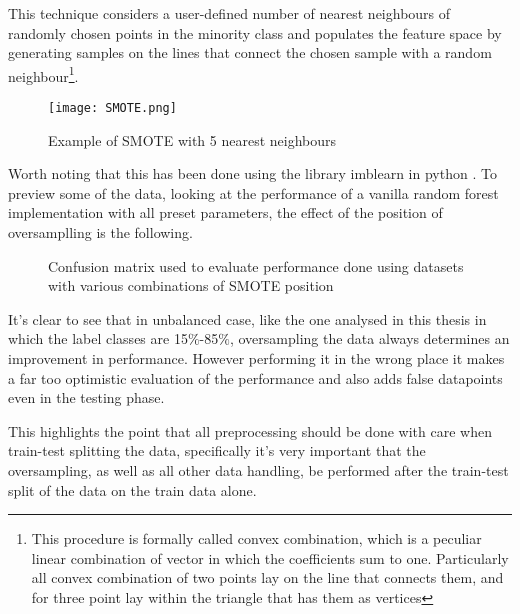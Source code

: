 This technique considers a user-defined number of nearest neighbours of randomly chosen points in the minority class and populates the feature space by generating samples on the lines that connect the chosen sample with a random neighbour\footnote{This procedure is formally called convex combination, which is a peculiar linear combination of vector in which the coefficients sum to one. Particularly all convex combination of two points lay on the line that connects them, and for three point lay within the triangle that has them as vertices}.


\begin{figure}[H]
		\centering
  		\texttt{[image: SMOTE.png]}
        \caption{Example of SMOTE with 5 nearest neighbours}
\end{figure}

Worth noting that this has been done using the library imblearn in python \cite{imblearn}. To preview some of the data, looking at the performance of a vanilla random forest implementation with all preset parameters, the effect of the position of oversamplling is the following.


\begin{figure}[H]
\centering
\centering \newline
    \caption{Confusion matrix used to evaluate performance done using datasets with various combinations of SMOTE position}\label{fig:smote_after}
\end{figure}

It's clear to see that in unbalanced case, like the one analysed in this thesis in which the label classes are 15$\%$-85$\%$, oversampling the data always determines an improvement in performance. However performing it in the wrong place it makes a far too optimistic evaluation of the performance and also adds false datapoints even in the testing phase. 

This highlights the point that all preprocessing should be done with care when train-test splitting the data, specifically it's very important that the oversampling, as well as all other data handling, be performed after the train-test split of the data on the train data alone. 

